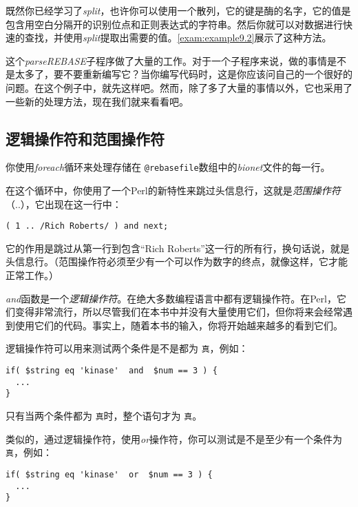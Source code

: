 既然你已经学习了\textit{split}，也许你可以使用一个散列，它的键是酶的名字，它的值是包含用空白分隔开的识别位点和正则表达式的字符串。然后你就可以对数据进行快速的查找，并使用\textit{split}提取出需要的值。\autoref{exam:example9.2}展示了这种方法。



这个\textit{parseREBASE}子程序做了大量的工作。对于一个子程序来说，做的事情是不是太多了，要不要重新编写它？当你编写代码时，这是你应该问自己的一个很好的问题。在这个例子中，就先这样吧。然而，除了多了大量的事情以外，它也采用了一些新的处理方法，现在我们就来看看吧。

\subsection{逻辑操作符和范围操作符}
你使用\textit{foreach}循环来处理存储在 \verb|@rebasefile|数组中的\textit{bionet}文件的每一行。

在这个循环中，你使用了一个Perl的新特性来跳过头信息行，这就是\textit{范围操作符}（..），它出现在这一行中：

\begin{lstlisting}
( 1 .. /Rich Roberts/ ) and next;
\end{lstlisting}

它的作用是跳过从第一行到包含“Rich Roberts”这一行的所有行，换句话说，就是头信息行。（范围操作符必须至少有一个可以作为数字的终点，就像这样，它才能正常工作。）

\textit{and}函数是一个\textit{逻辑操作符}。在绝大多数编程语言中都有逻辑操作符。在Perl，它们变得非常流行，所以尽管我们在本书中并没有大量使用它们，但你将来会经常遇到使用它们的代码。事实上，随着本书的输入，你将开始越来越多的看到它们。

逻辑操作符可以用来测试两个条件是不是都为 \verb|真|，例如：

\begin{lstlisting}
if( $string eq 'kinase'  and  $num == 3 ) {
  ...
}
\end{lstlisting}

只有当两个条件都为 \verb|真|时，整个语句才为 \verb|真|。

类似的，通过逻辑操作符，使用\textit{or}操作符，你可以测试是不是至少有一个条件为 \verb|真|，例如：

\begin{lstlisting}
if( $string eq 'kinase'  or  $num == 3 ) {
  ...
}
\end{lstlisting}

